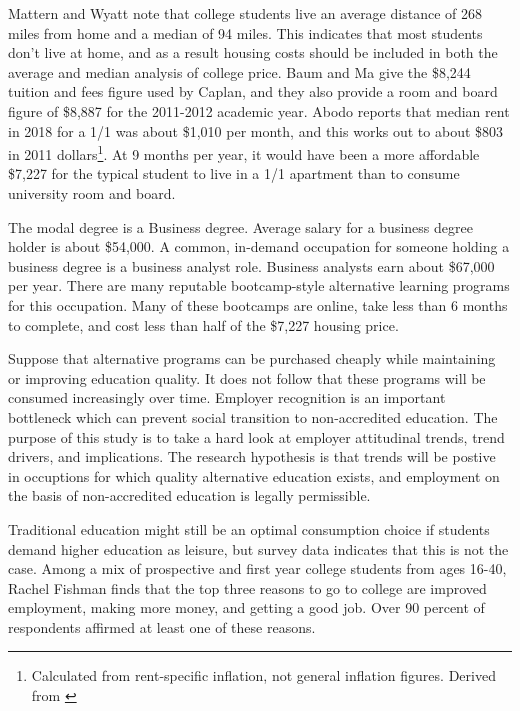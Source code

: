 \documentclass[AER]{./aea-latex-templates/AEA}
\begin{document}
Mattern and Wyatt\cite{mattern2009student} note that college students live an average distance of
268 miles from home and a median of 94 miles. This indicates that most
students don’t live at home, and as a result housing costs should be
included in both the average and median analysis of college price. Baum
and Ma give the \$8,244 tuition and fees figure used by Caplan, and they
also provide a room and board figure of \$8,887 for the 2011-2012 academic
year. Abodo reports that median rent in 2018 for a 1/1 was about \$1,010
per month\cite{abodo_2019}, and this works out to about \$803 in 2011
dollars\footnote{Calculated from rent-specific inflation, not general inflation
figures. Derived from \cite{alioth2019}}. At 9 months
per year, it would have been a more affordable \$7,227 for the typical
student to live in a 1/1 apartment than to consume university room and
board.

The modal degree is a Business degree. Average salary for a business
degree holder is about \$54,000\cite{adams2013college}. A common,
in-demand occupation for someone holding a business degree is a business
analyst role. Business analysts earn about \$67,000 per year. There
are many reputable bootcamp-style alternative learning programs for this
occupation\cite{white_2018}. Many of these bootcamps are online, take less than 6 months
to complete, and cost less than half of the \$7,227 housing price.

Suppose that alternative programs can be purchased cheaply while
maintaining or improving education quality. It does not follow that
these programs will be consumed increasingly over time. Employer recognition is
an important bottleneck which can prevent social transition to non-accredited
education. The purpose of this study is to take a hard look at employer
attitudinal trends, trend drivers, and implications. The research hypothesis
is that trends will be postive in occuptions for which quality alternative
education exists, and employment on the basis of non-accredited education
is legally permissible.

Traditional education might still be an optimal consumption choice if
students demand higher education as leisure, but survey data indicates
that this is not the case. Among a mix of prospective and first year
college students from ages 16-40\cite{fishman_2015}, Rachel Fishman finds that the top three
reasons to go to college are improved employment, making more money, and
getting a good job. Over 90 percent of respondents affirmed at least one of these
reasons.
\end{document}
